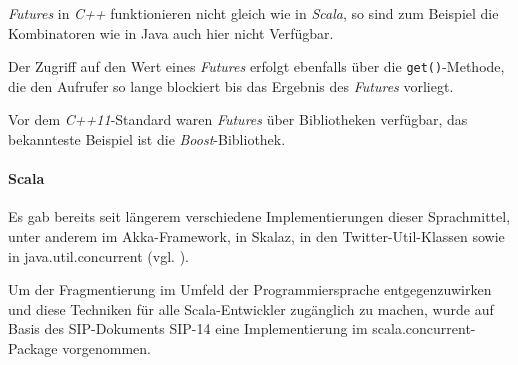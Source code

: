 \emph{Futures} in \emph{C++} funktionieren nicht gleich wie in
\emph{Scala}, so sind zum Beispiel die Kombinatoren wie in Java auch 
hier nicht Verfügbar.

Der Zugriff auf den Wert eines \emph{Futures} erfolgt ebenfalls über die
\texttt{get()}-Methode, die den Aufrufer so lange blockiert bis
das Ergebnis des \emph{Futures} vorliegt.

Vor dem \emph{C++11}-Standard waren \emph{Futures} über Bibliotheken
verfügbar, das bekannteste Beispiel ist die \emph{Boost}-Bibliothek.

\paragraph{Scala} Es gab bereits seit längerem verschiedene 
Implementierungen dieser Sprachmittel,
unter anderem im Akka-Framework, in Skalaz, in den Twitter-Util-Klassen sowie
in java.util.concurrent (vgl. \cite{futuresTry}).

Um der Fragmentierung im Umfeld der Programmiersprache entgegenzuwirken und
diese Techniken für alle Scala-Entwickler zugänglich zu machen, wurde auf Basis
des SIP-Dokuments SIP-14 eine Implementierung im scala.concurrent-Package
vorgenommen.
